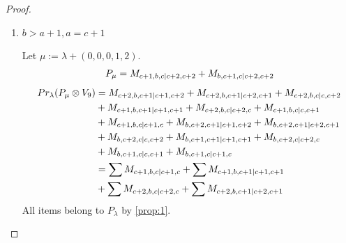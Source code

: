 \begin{proof}
\begin{enumerate}
\begin{enumerate}
        \item $b>a+1,a=c+1$ \par
        Let $\mu:=\lambda + (0,0,0,1,2) $.
        \begin{equation}\notag
          \begin{aligned}
            P_\mu = M_{c+1,b,c|c+2,c+2}
+ M_{b,c+1,c|c+2,c+2}
          \end{aligned}
        \end{equation}
        \begin{equation}\notag
          \begin{aligned}
            Pr_{\lambda}(P_\mu \otimes V_{9}) &=
M_{c+2,b,c+1|c+1,c+2}
+ M_{c+2,b,c+1|c+2,c+1}
+ M_{c+2,b,c|c,c+2}\\
                                              &
+ M_{c+1,b,c+1|c+1,c+1}
+ M_{c+2,b,c|c+2,c}
+ M_{c+1,b,c|c,c+1}\\
                                              &
+ M_{c+1,b,c|c+1,c}
+ M_{b,c+2,c+1|c+1,c+2}
+ M_{b,c+2,c+1|c+2,c+1}\\
                                              &
+ M_{b,c+2,c|c,c+2}
+ M_{b,c+1,c+1|c+1,c+1}
+ M_{b,c+2,c|c+2,c}\\
                                              &
+ M_{b,c+1,c|c,c+1}
+ M_{b,c+1,c|c+1,c} \\
                                               &=
\sum M_{c+1,b,c|c+1,c}
+ \sum M_{c+1,b,c+1|c+1,c+1}\\
                                              &
+ \sum M_{c+2,b,c|c+2,c}
+ \sum M_{c+2,b,c+1|c+2,c+1}
          \end{aligned}
        \end{equation}
All items belong to $P_\lambda$ by \cref{prop:1}.


\end{enumerate}
\end{enumerate}
\end{proof}
